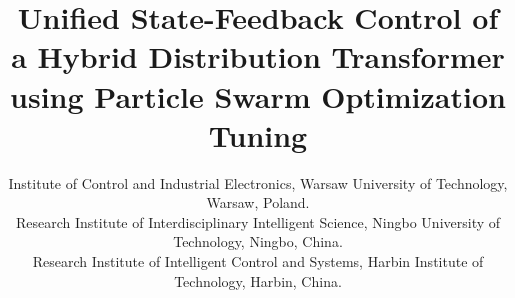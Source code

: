 \title{Unified State-Feedback Control of a Hybrid Distribution Transformer using Particle Swarm Optimization Tuning\\
}

\author{
\and
{}
\and
{}
\linebreakand
{}
\and
{}
\linebreakand
{} Institute of Control and Industrial Electronics, Warsaw University of Technology, Warsaw, Poland.\\
 Research Institute of Interdisciplinary Intelligent Science, Ningbo University of Technology, Ningbo, China.\\
 Research Institute of Intelligent Control and Systems, Harbin Institute of Technology, Harbin, China.\\
}